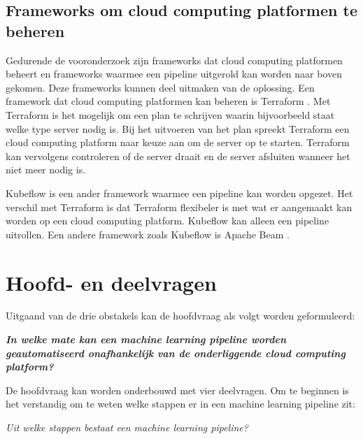 \subsection{Frameworks om cloud computing platformen te beheren}\label{subsec:frameworks-om-cloud-computing-platformen-te-beheren}
Gedurende de vooronderzoek zijn frameworks dat cloud computing platformen beheert en frameworks waarmee een pipeline uitgerold kan worden naar boven gekomen. Deze frameworks kunnen deel uitmaken van de oplossing. Een framework dat cloud computing platformen kan beheren is Terraform \cite{terraform}. Met Terraform is het mogelijk om een plan te schrijven waarin bijvoorbeeld staat welke type server nodig is. Bij het uitvoeren van het plan spreekt Terraform een cloud computing platform naar keuze aan om de server op te starten. Terraform kan vervolgens controleren of de server draait en de server afsluiten wanneer het niet meer nodig is.

Kubeflow \cite{kubeflow} is een ander framework waarmee een pipeline kan worden opgezet. Het verschil met Terraform is dat Terraform flexibeler is met wat er aangemaakt kan worden op een cloud computing platform. Kubeflow kan alleen een pipeline uitrollen. Een andere framework zoals Kubeflow is Apache Beam \cite{apache-beam}.

\section{Hoofd- en deelvragen}\label{sec:hoofd-en-deelvragen}
Uitgaand van de drie obstakels kan de hoofdvraag als volgt worden geformuleerd:

\begin{quoting}
  \begin{center}
    \textbf{
      \textit{
        In welke mate kan een machine learning pipeline worden geautomatiseerd onafhankelijk van de onderliggende cloud computing platform?
      }
    }
  \end{center}
\end{quoting}\smallskip

De hoofdvraag kan worden onderbouwd met vier deelvragen. Om te beginnen is het verstandig om te weten welke stappen er in een machine learning pipeline zit:

\begin{quoting}
  \begin{center}
    \textit{
      Uit welke stappen bestaat een machine learning pipeline?
    }
  \end{center}
\end{quoting}\smallskip

